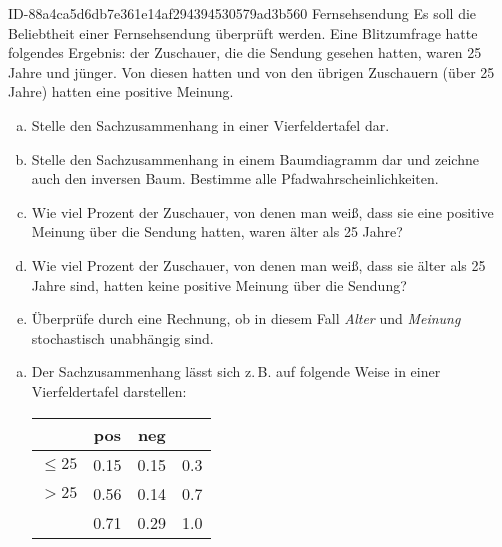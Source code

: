 \begin{exercise}
      {ID-88a4ca5d6db7e361e14af294394530579ad3b560}
      {Fernsehsendung}
  \ifproblem\problem
    Es soll die Beliebtheit einer Fernsehsendung überprüft werden.
    Eine Blitzumfrage hatte folgendes Ergebnis:  der Zuschauer,
    die die Sendung gesehen hatten, waren 25 Jahre und jünger.
    Von diesen hatten  und von den übrigen Zuschauern (über 25
    Jahre) hatten  eine positive Meinung.
    \begin{enumerate}[a)]
      \item Stelle den Sachzusammenhang in einer Vierfeldertafel dar.
      \item Stelle den Sachzusammenhang in einem Baumdiagramm dar und
            zeichne auch den inversen Baum. Bestimme alle Pfadwahrscheinlichkeiten.
      \item Wie viel Prozent der Zuschauer, von denen man weiß, dass sie
            eine positive Meinung über die Sendung hatten, waren älter
            als 25 Jahre?
      \item Wie viel Prozent der Zuschauer, von denen man weiß, dass sie
            älter als 25 Jahre sind, hatten keine positive Meinung über
            die Sendung?
      \item Überprüfe durch eine Rechnung, ob in diesem Fall \textit{Alter} und
            \textit{Meinung} stochastisch unabhängig sind.
    \end{enumerate}
  \fi
  \ifoutcome\outcome
    \begin{enumerate}[a)]
      \item Der Sachzusammenhang lässt sich z.\,B. auf folgende Weise in
            einer Vierfeldertafel darstellen:
            \begin{center}
              \begin{tabular}{|c||c|c||c|}
                \hline
                         & pos        & neg        &           \\
                \hline
                \hline
                $\leq25$ & \num{0.15} & \num{0.15} & \num{0.3} \\
                \hline
                $>25$    & \num{0.56} & \num{0.14} & \num{0.7} \\
                \hline
                \hline
                         & \num{0.71} & \num{0.29} & \num{1.0} \\
                \hline
              \end{tabular}
            \end{center}

\end{enumerate}
\end{exercise}

